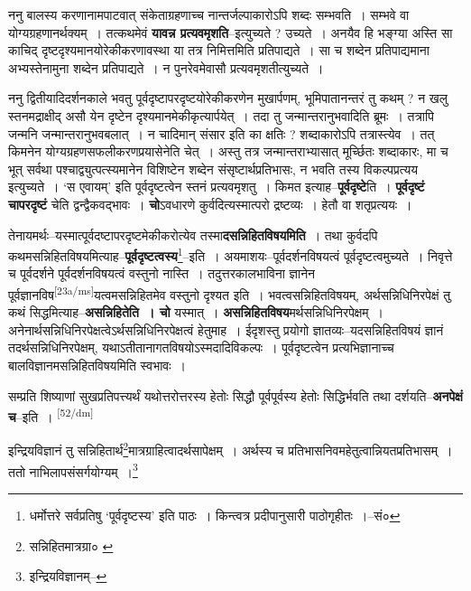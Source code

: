 \documentclass[article,12pt,a4paper]{memoir}
\begin{document}
	  \pstart ननु बालस्य करणानामपाटवात् संकेताग्रहणाच्च नान्तर्जल्पाकारोऽपि शब्दः सम्भवति । सम्भवे वा योग्यग्रहणानर्थक्यम् । तत्कथमेवं \textbf{यावन्न प्रत्यवमृशति}--इत्युच्यते ? उच्यते । अनयैव हि भङ्ग्या अस्ति सा काचिद् दृष्टदृश्यमानयोरेकीकरणावस्था या तत्र निमित्तमिति प्रतिपाद्यते । सा च शब्देन प्रतिपाद्यमाना अभ्यस्तेनामुना शब्देन प्रतिपाद्यते । न पुनरेवमेवासौ प्रत्यवमृशतीत्युच्यते ।
	\pend
      

	  \pstart ननु द्वितीयादिदर्शनकाले भवतु पूर्वदृष्टापरदृष्टयोरेकीकरणेन मुखार्पणम्, भूमिपातानन्तरं तु कथम् ? न खलु स्तनमद्राक्षीद् असौ येन दृष्टेन दृश्यमानमेकीकृत्यार्पयेत् । तदा तु जन्मान्तरानुभवादिति ब्रूमः । तत्रापि जन्मनि जन्मान्तरानुभवबलात् । न चादिमान् संसार इति का क्षतिः ? शब्दाकारोऽपि तत्रास्त्येव । तत् किमनेन योग्यग्रहणसफलीकरणप्रयासेनेति चेत् । अस्तु तत्र जन्मान्तराभ्यासात् मूर्च्छितः शब्दाकारः, मा च भूत् सर्वथा पश्चाद्व्युत्पत्स्यमानेन विशिष्टेन शब्देन संसृष्टार्थप्रतिभासः, न भवति तस्य विकल्पप्रत्यय इत्युच्यते । ‘स एवायम्’ इति पूर्वदृष्टत्वेन स्तनं प्रत्यवमृशतु । किमत इत्याह--\textbf{पूर्वदृष्टे}ति । \textbf{पूर्वदृष्टं चापरदृष्टं} चेति द्वन्द्वैकवद्भावः । \textbf{चो}ऽवधारणे कुर्वदित्यस्मात्परो द्रष्टव्यः । हेतौ वा शतृप्रत्ययः ।
	\pend
      

	  \pstart तेनायमर्थः--यस्मात्पूर्वदष्टापरदृष्टमेकीकरोत्येव तस्मा\textbf{दसन्निहितविषयमिति} । तथा कुर्वदपि कथमसन्निहितविषयमित्याह--\textbf{पूर्वदृष्टत्वस्य}\footnote{धर्मोत्तरे सर्वप्रतिषु ‘पूर्वदृष्टस्य’ इति पाठः । किन्त्वत्र प्रदीपानुसारी पाठोगृहीतः ।--सं०}--इति । अयमाशयः--पूर्वदर्शनविषयत्वं पूर्वदृष्टत्वमुच्यते । निवृत्ते च पूर्वदर्शने पूर्वदर्शनविषयत्वं वस्तुनो नास्ति । तदुत्तरकालभाविना ज्ञानेन पूर्वज्ञानविष\leavevmode\textsuperscript{\rmlatinfont\tiny [23a/ms]}यत्वमसन्निहितमेव वस्तुनो दृश्यत इति । भवत्वसन्निहितविषयम्, अर्थसन्निधिनिरपेक्षं तु कथं सिद्धमित्याह--\textbf{असन्निहितेति । चो} यस्मात् । \textbf{असन्निहितविषय}मर्थसन्निधिनिरपेक्षम् । अनेनार्थसन्निधिनिरपेक्षत्वेऽर्थसन्निधिनिरपेक्षत्वं हेतुमाह । ईदृशस्तु प्रयोगो ज्ञातव्यः--यदसन्निहितविषयं ज्ञानं तदर्थसन्निधिनिरपेक्षम्, यथाऽतीतानागतविषयोऽस्मदादिविकल्पः । पूर्वदृष्टत्वेन प्रत्यभिज्ञानाच्च बालविज्ञानमसन्निहितविषयमिति स्वभावः ।
	\pend
      

	  \pstart सम्प्रति शिष्याणां सुखप्रतिपत्त्यर्थं यथोत्तरोत्तरस्य हेतोः सिद्धौ पूर्वपूर्वस्य हेतोः सिद्धिर्भवति तथा दर्शयति--\textbf{अनपेक्षं च}--इति ।
	\pend
      \leavevmode\textsuperscript{\rmlatinfont\tiny [52/dm]}

	  \pstart इन्द्रियविज्ञानं तु सन्निहितार्थ\footnote{सन्निहितमात्रग्रा० \cite{dp-msA} \cite{dp-edP} \cite{dp-edH} \cite{dp-edE} \cite{dp-edN}}मात्रग्राहित्वादर्थसापेक्षम् । अर्थस्य च प्रतिभासनिवमहेतुत्वान्नियतप्रतिभासम् । ततो नाभिलापसंसर्गयोग्यम् ।\footnote{इन्द्रियविज्ञानम्--\cite{dp-msD-n}}
	\pend
       
\end{document}
